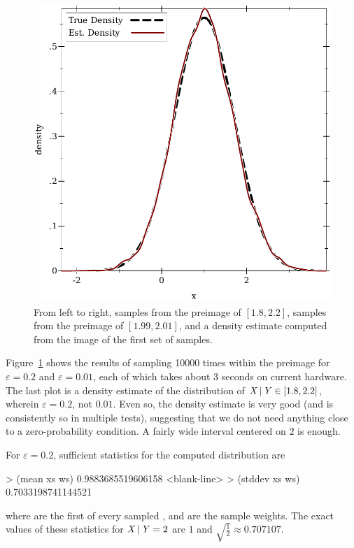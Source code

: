 \begin{figure}[tb!]
\includegraphics[width=\subfigurewidth]{results/normal-normal-density}%
\caption[Samples from Dr. Bayes and a density estimate]{From left to right, samples from the preimage of {$[1.8,2.2]$}, samples from the preimage of {$[1.99,2.01]$}, and a density estimate computed from the image of the first set of samples.}%
\label{fig:normal-normal}
\end{figure}

Figure~\ref{fig:normal-normal} shows the results of sampling 10000 times within the preimage for $\varepsilon = 0.2$ and $\varepsilon = 0.01$, each of which takes about 3 seconds on current hardware.
The last plot is a density estimate of the distribution of $\mathit{X} \,|\, \mathit{Y} \in [1.8,2.2]$, wherein $\varepsilon = 0.2$, not $0.01$.
Even so, the density estimate is very good (and is consistently so in multiple tests), suggesting that we do not need anything close to a zero-probability condition.
A fairly wide interval centered on $2$ is enough.

For $\varepsilon = 0.2$, sufficient statistics for the computed distribution are
\begin{center}\singlespacing
\begin{schemedisplay}
> (mean xs ws)
0.9883685519606158
<blank-line>
> (stddev xs ws)
0.7033198741144521
\end{schemedisplay}
\end{center}
where  are the first of every sampled , and  are the sample weights.
The exact values of these statistics for $\mathit{X} \,|\, \mathit{Y} = 2$ are $1$ and $\sqrt{\frac{1}{2}} \approx 0.707107$.

